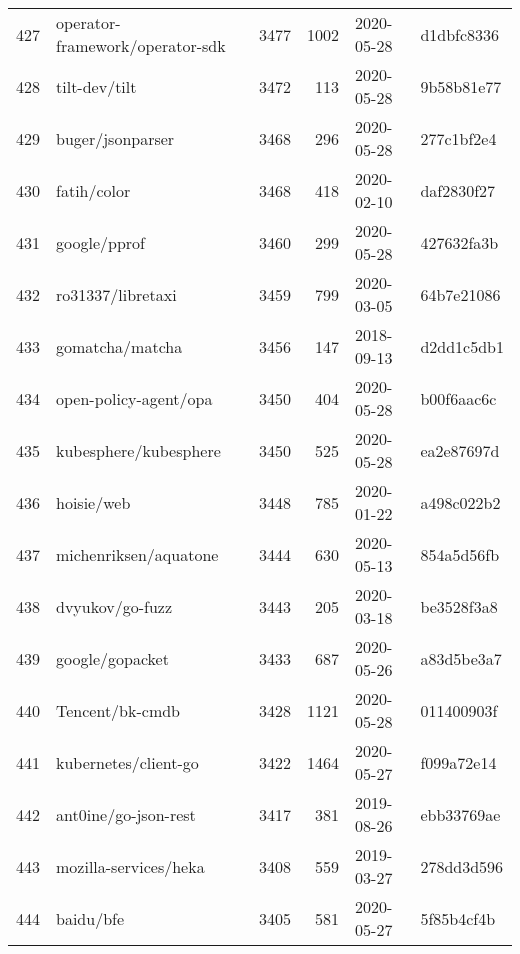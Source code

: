 \begin{longtable}{llrrll}
    427 &                    operator-framework/operator-sdk &   3477 &   1002 & 2020-05-28 &  d1dbfc8336 \\
    428 &                                      tilt-dev/tilt &   3472 &    113 & 2020-05-28 &  9b58b81e77 \\
    429 &                                   buger/jsonparser &   3468 &    296 & 2020-05-28 &  277c1bf2e4 \\
    430 &                                        fatih/color &   3468 &    418 & 2020-02-10 &  daf2830f27 \\
    431 &                                       google/pprof &   3460 &    299 & 2020-05-28 &  427632fa3b \\
    432 &                                  ro31337/libretaxi &   3459 &    799 & 2020-03-05 &  64b7e21086 \\
    433 &                                    gomatcha/matcha &   3456 &    147 & 2018-09-13 &  d2dd1c5db1 \\
    434 &                              open-policy-agent/opa &   3450 &    404 & 2020-05-28 &  b00f6aac6c \\
    435 &                              kubesphere/kubesphere &   3450 &    525 & 2020-05-28 &  ea2e87697d \\
    436 &                                         hoisie/web &   3448 &    785 & 2020-01-22 &  a498c022b2 \\
    437 &                              michenriksen/aquatone &   3444 &    630 & 2020-05-13 &  854a5d56fb \\
    438 &                                    dvyukov/go-fuzz &   3443 &    205 & 2020-03-18 &  be3528f3a8 \\
    439 &                                    google/gopacket &   3433 &    687 & 2020-05-26 &  a83d5be3a7 \\
    440 &                                    Tencent/bk-cmdb &   3428 &   1121 & 2020-05-28 &  011400903f \\
    441 &                               kubernetes/client-go &   3422 &   1464 & 2020-05-27 &  f099a72e14 \\
    442 &                               ant0ine/go-json-rest &   3417 &    381 & 2019-08-26 &  ebb33769ae \\
    443 &                              mozilla-services/heka &   3408 &    559 & 2019-03-27 &  278dd3d596 \\
    444 &                                          baidu/bfe &   3405 &    581 & 2020-05-27 &  5f85b4cf4b \\

\end{longtable}

